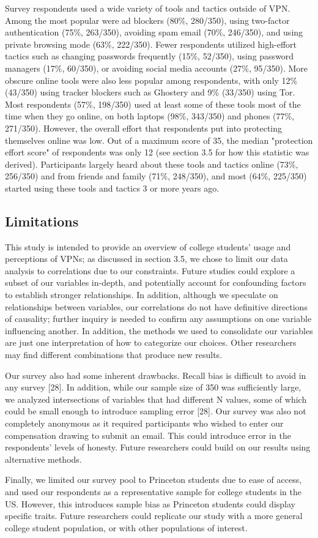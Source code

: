 Survey respondents used a wide variety of tools and tactics outside of VPN.
Among the most popular were ad blockers (80\%, 280/350), using two-factor
authentication (75\%, 263/350), avoiding spam email (70\%, 246/350), and using
private browsing mode (63\%, 222/350). Fewer respondents utilized high-effort
tactics such as changing passwords frequently (15\%, 52/350), using password
managers (17\%, 60/350), or avoiding social media accounts (27\%, 95/350).
More obscure online tools were also less popular among respondents, with only
12\% (43/350) using tracker blockers such as Ghostery and 9\% (33/350) using
Tor. Most respondents (57\%, 198/350) used at least some of these tools most
of the time when they go online, on both laptops (98\%, 343/350) and phones
(77\%, 271/350). However, the overall effort that respondents put into
protecting themselves online was low. Out of a maximum score of 35, the median
"protection effort score" of respondents was only 12 (see section 3.5 for how
this statistic was derived). Participants largely heard about these tools and
tactics online (73\%, 256/350) and from friends and family (71\%, 248/350),
and most (64\%, 225/350) started using these tools and tactics 3 or more years
ago.

\subsection{Limitations}

This study is intended to provide an overview of college students' usage and
perceptions of VPNs; as discussed in section 3.5, we chose to limit our data
analysis to correlations due to our constraints. Future studies could explore
a subset of our variables in-depth, and potentially account for confounding
factors to establish stronger relationships. In addition, although we
speculate on relationships between variables, our correlations do not have
definitive directions of causality; further inquiry is needed to confirm any
assumptions on one variable influencing another. In addition, the methods we
used to consolidate our variables are just one interpretation of how to
categorize our choices. Other researchers may find different combinations that
produce new results.

Our survey also had some inherent drawbacks. Recall bias is difficult to avoid
in any survey [28]. In addition, while our sample size of 350 was sufficiently
large, we analyzed intersections of variables that had different N values,
some of which could be small enough to introduce sampling error [28]. Our
survey was also not completely anonymous as it required participants who
wished to enter our compensation drawing to submit an email. This could
introduce error in the respondents' levels of honesty. Future researchers
could build on our results using alternative methods.

Finally, we limited our survey pool to Princeton students due to ease of
access, and used our respondents as a representative sample for college
students in the US. However, this introduces sample bias as Princeton students
could display specific traits. Future researchers could replicate our study
with a more general college student population, or with other populations of
interest.
